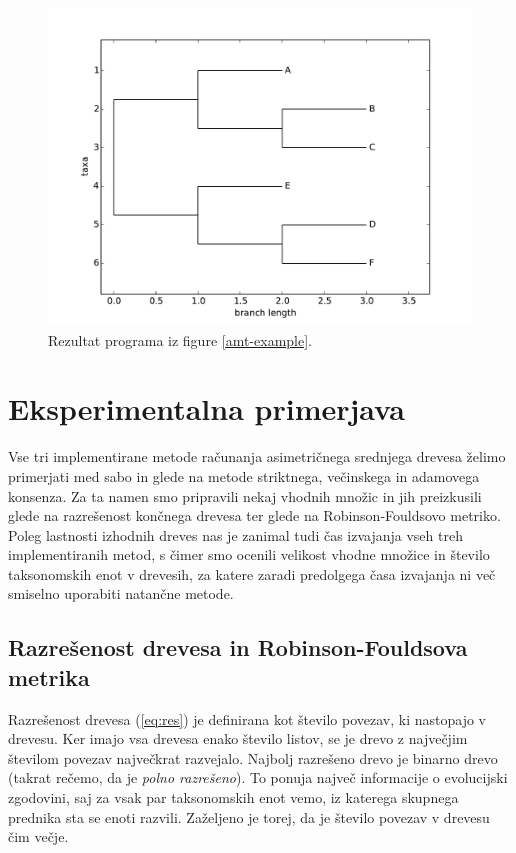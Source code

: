 \documentclass[a4paper, 12pt]{book}
\begin{document}
\begin{figure}[h!]
	\begin{center}
		\includegraphics[scale=0.65, clip=true, trim=1cm 0 1cm 1cm]{gfx/ex_b.pdf}
	\end{center}
	\caption{Rezultat programa iz figure \ref{amt-example}.}
	\label{img-example-output}
\end{figure}

\chapter{Eksperimentalna primerjava}

Vse tri implementirane metode računanja asimetričnega srednjega drevesa želimo primerjati med sabo in glede na metode striktnega, večinskega in adamovega konsenza. Za ta namen smo pripravili nekaj vhodnih množic in jih preizkusili glede na razrešenost končnega drevesa ter glede na Robinson-Fouldsovo metriko. Poleg lastnosti izhodnih dreves nas je zanimal tudi čas izvajanja vseh treh implementiranih metod, s čimer smo ocenili velikost vhodne množice in število taksonomskih enot v drevesih, za katere zaradi predolgega časa izvajanja ni več smiselno uporabiti  natančne metode. 

\section{Razrešenost drevesa in Robinson-Fouldsova metrika}
Razrešenost drevesa (\ref{eq:res}) je definirana kot število povezav, ki nastopajo v drevesu. Ker imajo vsa drevesa enako število listov, se je drevo z največjim številom povezav največkrat razvejalo. Najbolj razrešeno drevo je binarno drevo (takrat rečemo, da je {\it polno razrešeno}). To ponuja največ informacije o evolucijski zgodovini, saj za vsak par taksonomskih enot vemo, iz katerega skupnega prednika sta se enoti razvili. Zaželjeno je torej, da je število povezav v drevesu čim večje.
\end{document}
